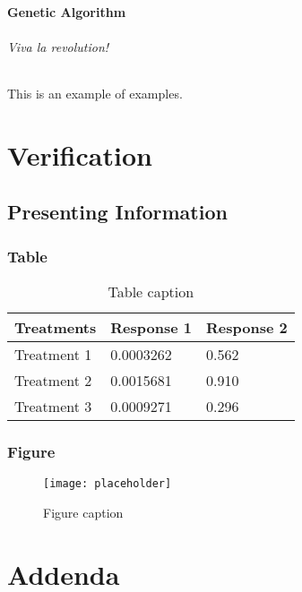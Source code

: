 \documentclass[11pt,fleqn,,a4paper,twoside,openright]{book}
\begin{document}
\subsection{Genetic Algorithm}

\paragraph{Viva la revolution!}

This is an example of examples.

\part{Verification}


\chapter{Presenting Information}

\section{Table}

\begin{table}[h]
\centering
\begin{tabular}{l l l}
\toprule
\textbf{Treatments} & \textbf{Response 1} & \textbf{Response 2}\\
\midrule
Treatment 1 & 0.0003262 & 0.562 \\
Treatment 2 & 0.0015681 & 0.910 \\
Treatment 3 & 0.0009271 & 0.296 \\
\bottomrule
\end{tabular}
\caption{Table caption}
\end{table}

\section{Figure}

\begin{figure}[h]
\centering\texttt{[image: placeholder]}
\caption{Figure caption}
\end{figure}

\part{Addenda}
\end{document}
